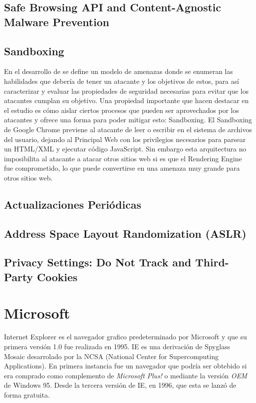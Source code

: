 \subsection{Safe Browsing API and Content-Agnostic Malware Prevention}
\subsection{Sandboxing}
En el desarrollo de \cite{barth2008security} se define un modelo de amenazas donde se enumeran las habilidades que debería de tener un atacante y los objetivos de estos, para así caracterizar y evaluar las propiedades de seguridad necesarias para evitar que los atacantes cumplan su objetivo. Una propiedad importante que hacen destacar en el estudio es cómo aislar ciertos procesos que pueden ser aprovechados por los atacantes y ofrece una forma para poder mitigar esto: Sandboxing. El Sandboxing de Google Chrome previene al atacante de leer o escribir en el sistema de archivos del usuario, dejando al Principal Web con los privilegios necesarios para parsear un HTML/XML y ejecutar código JavaScript. Sin embargo esta arquitectura no imposibilita al atacante a atacar otros sitios web si es que el Rendering Engine fue comprometido, lo que puede convertirse en una amenaza muy grande para otros sitios web.

\subsection{Actualizaciones Periódicas}

\subsection{Address Space Layout Randomization (ASLR)}

\subsection{Privacy Settings: Do Not Track and Third-Party Cookies}


\section{Microsoft}
Internet Explorer es el navegador grafico predeterminado por Microsoft y que su primera versión 1.0 fue realizada en 1995. IE es una derivación de Spyglass Mosaic desarrolado por la NCSA (National Center for Supercomputing Applications). En primera instancia fue un navegador que podría ser obtebido si era comprado como complemento de \textit{Microsoft Plus!} o mediante la versión \textit{OEM} de Windows 95. Desde la tercera versión de IE, en 1996, que esta se lanzó de forma gratuita.
        
